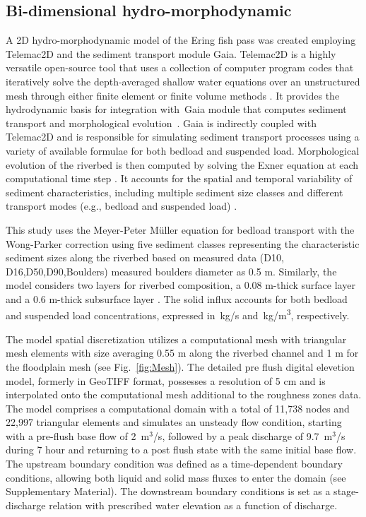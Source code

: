 \documentclass[draft,linenumbers,onecolumn]{agujournal2019} %
\begin{document}
\subsection{Bi-dimensional hydro-morphodynamic}
\label{sec:Sec2.2}
A 2D hydro-morphodynamic model of the Ering fish pass was created employing Telemac2D and the sediment transport module Gaia. Telemac2D is a  highly versatile open-source tool that uses a collection of computer program codes that iteratively solve the depth-averaged shallow water equations \cite{saint-venant1871theorie} over an unstructured mesh through either finite element or finite volume methods \cite{galland1991telemac,hervouet2007hydrodynamics}. It provides the hydrodynamic basis for integration with Gaia module that computes sediment transport and morphological evolution \cite{tassi2023gaia}. Gaia is indirectly coupled with Telemac2D and is responsible for simulating sediment transport processes using a variety of available formulae for both bedload and suspended load. Morphological evolution of the riverbed is then computed by solving the Exner equation at each computational time step \cite{audouin2020introducing}. It accounts for the spatial and temporal variability of sediment characteristics, including multiple sediment size classes and different transport modes (e.g., bedload and suspended load) \cite{exner1925uber,tassi2023gaia}. 

This study uses the Meyer-Peter Müller equation for bedload transport with the Wong-Parker correction \cite{wong2006reanalysis} using five sediment classes representing the characteristic sediment sizes along the riverbed based on measured data (D10, D16,D50,D90,Boulders) measured boulders diameter as 0.5 m. Similarly, the model considers two layers for riverbed composition, a 0.08 m-thick surface layer and a 0.6 m-thick subsurface layer \cite{scolari2025hydromorphodynamic}. The solid influx accounts for both bedload and suspended load concentrations, expressed in~kg/s and~kg/m\textsuperscript{3}, respectively.

The model spatial discretization utilizes a computational mesh with triangular mesh elements with size averaging 0.55 m along the riverbed channel and 1 m for the floodplain mesh (see Fig.~\ref{fig:Mesh}). The detailed pre flush digital elevetion model, formerly in GeoTIFF format, possesses a resolution of 5 cm and is interpolated onto the computational mesh additional to the roughness zones data. The model comprises a computational domain with a total of 11,738 nodes and 22,997 triangular elements and simulates an unsteady flow condition, starting with a pre-flush base flow of 2~m$^3$/s, followed by a peak discharge of 9.7~m$^3$/s during 7 hour and returning to a post flush state with the same initial base flow. The upstream boundary condition was defined as a time-dependent boundary conditions, allowing both liquid and solid mass fluxes to enter the domain (see Supplementary Material). 
The downstream boundary conditions is set as a stage-discharge relation with prescribed water elevation as a function of discharge. 
\end{document}
